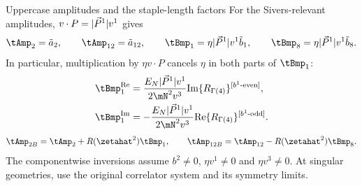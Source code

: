 \begin{frame}{Uppercase amplitudes and the staple-length factors}
  \small
  For the Sivers-relevant amplitudes, $v\cdot P=|\vec P^{1}| v^1$ gives
  \[
    \tAmp_2=\tilde a_2,\qquad \tAmp_{12}=\tilde a_{12},\qquad
    \tBmp_1=\eta\Pa v^1\tilde b_1,\qquad
    \tBmp_8=\eta\Pa v^1\tilde b_8.
  \]
  In particular, multiplication by $\eta v\cdot P$ cancels $\eta$ in both parts of $\tBmp_1$:
  \begin{align*}
    \tBmp_1^{\rm Re}&=\frac{\En\Pa v^1}{2\mN^2v^3}
       \Rr{Im}{4}{b^1\text{-even}},\\
    \tBmp_1^{\rm Im}&=-\frac{\En\Pa v^1}{2\mN^2v^3}
       \Rr{Re}{4}{b^1\text{-odd}}.
  \end{align*}
  \[
   \tAmp_{2B}=\tAmp_2+R(\zetahat^2)\tBmp_1,\qquad
   \tAmp_{12B}=\tAmp_{12}-R(\zetahat^2)\tBmp_8.
  \]
  The componentwise inversions assume $b^2\ne0$, $\eta v^1\ne0$ and $\eta v^3\ne0$.
  At singular geometries, use the original correlator system and its symmetry limits.
\end{frame}
